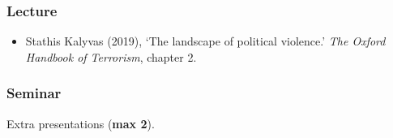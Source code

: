 \documentclass[12pt, a4paper]{article}
\begin{document}
\subsubsection*{Lecture}

\begin{itemize}
\setlength\itemsep{0pt}
\item Stathis Kalyvas (2019), `The landscape of political violence.' \textit{The Oxford Handbook of Terrorism}, chapter 2.
\end{itemize}

\subsubsection*{Seminar}

Extra presentations (\textbf{max 2}).
\end{document}
